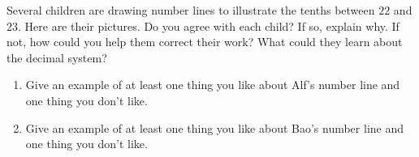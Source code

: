 \documentclass{ximera}
\begin{document}
\begin{problem}
 Several children are drawing number lines to illustrate the tenths between $22$ and $23$. Here are their pictures. Do you agree with each child?  If so, explain why.  If not, how could you help them correct their work?  What could they learn about the decimal system?

\begin {center}
\end{center}

\begin{enumerate}
	\item Give an example of at least one thing you like about Alf's number line and one thing you don't like.
	\item Give an example of at least one thing you like about Bao's number line and one thing you don't like.
\end{enumerate}
\end{problem}
\end{document}
